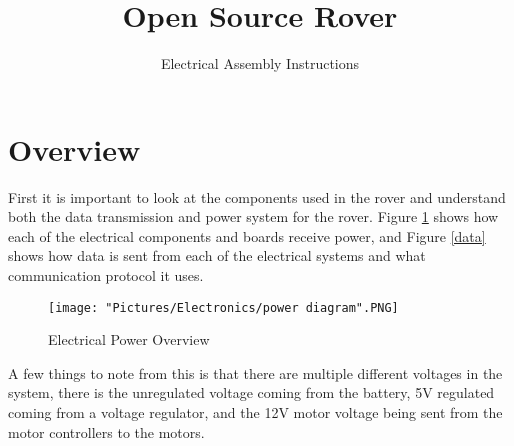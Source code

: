 \documentclass[12pt]{article}
\begin{document}
\title{Open Source Rover}
\author{Electrical Assembly Instructions}

\makeatletter         
\def\@maketitle{
\begin{center}	
	\makebox[\textwidth][c]{ \texttt{[image: "Pictures/Electronics/electronics title".png]}}
	{\Huge \bfseries \sffamily \@title }\\[4ex] 
	{\huge \bfseries \sffamily \@author}\\[4ex] 
	\texttt{[image: "Pictures/Electronics/JPL logo".png]}
\end{center}}
\makeatother

\maketitle

\newpage


\tableofcontents

\newpage

%
%
%


\section{Overview}

First it is important to look at the components used in the rover and understand both the data transmission and power system for the rover. Figure \ref{power} shows how each of the electrical components and boards receive power, and Figure \ref{data} shows how data is sent from each of the electrical systems and what communication protocol it uses. 
\begin{figure}[H]
  	\centering
    	\texttt{[image: "Pictures/Electronics/power diagram".PNG]}
  	\caption{Electrical Power Overview}
	\label{power}
\end{figure}

\noindent A few things to note from this is that there are multiple different voltages in the system, there is the unregulated voltage coming from the battery, 5V regulated coming from a voltage regulator, and the 12V motor voltage being sent from the motor controllers to the motors. 
\end{document}
